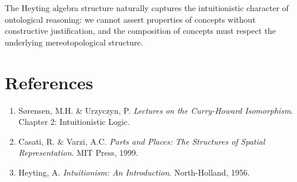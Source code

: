 \documentclass[12pt,a4paper]{article}
\theoremstyle{definition}
\theoremstyle{plain}
\theoremstyle{remark}
\begin{document}
The Heyting algebra structure naturally captures the intuitionistic character of ontological reasoning: we cannot assert properties of concepts without constructive justification, and the composition of concepts must respect the underlying mereotopological structure.

\section*{References}

\begin{enumerate}
    \item Sørensen, M.H. \& Urzyczyn, P. \textit{Lectures on the Curry-Howard Isomorphism}. Chapter 2: Intuitionistic Logic.
    \item Casati, R. \& Varzi, A.C. \textit{Parts and Places: The Structures of Spatial Representation}. MIT Press, 1999.
    \item Heyting, A. \textit{Intuitionism: An Introduction}. North-Holland, 1956.
\end{enumerate}
\end{document}
